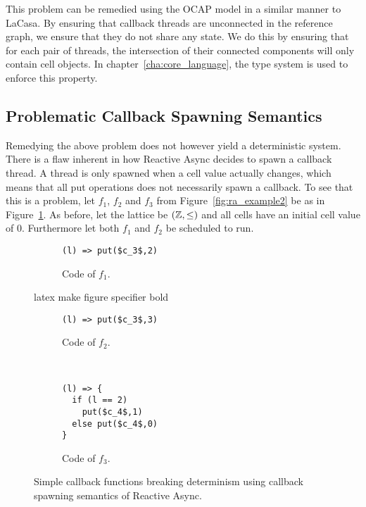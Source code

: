 This problem can be remedied using the OCAP model in a similar manner to LaCasa.
By ensuring that callback threads are unconnected in the reference graph, we ensure
that they do not share any state. We do this by ensuring that for each pair of
threads, the intersection of their connected components will only contain cell
objects. In chapter~\ref{cha:core_language}, the type system is used to enforce
this property.

\subsection{Problematic Callback Spawning Semantics}%
\label{sub:problematic_callback_spawning_semantics}

Remedying the above problem does not however yield a deterministic system.
There is a flaw inherent in how Reactive Async decides to spawn a callback
thread. A thread is only spawned when a cell value actually changes, which means
that all put operations does not necessarily spawn a callback. To see that this
is a problem, let $f_1$, $f_2$ and $f_3$ from Figure~\ref{fig:ra_example2} be as in
Figure~\ref{fig:ra_fun_callback_spawn}. As before, let the lattice be
$(\mathbb{Z}, \leq)$ and all cells have an initial cell value of $0$. Furthermore
let both $f_1$ and $f_2$ be scheduled to run.

\begin{figure}
  \begin{minipage}{0.5\textwidth}
    \begin{subfigure}[b]{\linewidth}
      \begin{lstlisting}
(l) => put($c_3$,2)
      \end{lstlisting}
      \caption{Code of $f_1$.}
    \end{subfigure}
    latex make figure specifier bold
    \begin{subfigure}[b]{\linewidth}
      \begin{lstlisting}
(l) => put($c_3$,3)
      \end{lstlisting}
      \caption{Code of $f_2$.}
    \end{subfigure}
  \end{minipage}
  ~
  \begin{minipage}{0.5\textwidth}
    \begin{subfigure}[b]{\linewidth}
      \begin{lstlisting}
(l) => {
  if (l == 2)
    put($c_4$,1)
  else put($c_4$,0)
}
      \end{lstlisting}
      \caption{Code of $f_3$.}
    \end{subfigure}
  \end{minipage}
  \caption{Simple callback functions breaking determinism using callback
  spawning semantics of Reactive Async.}
  \label{fig:ra_fun_callback_spawn}
\end{figure}

